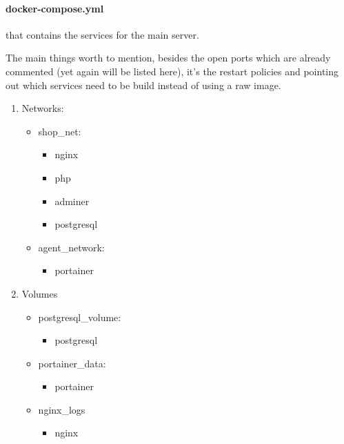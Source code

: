     \paragraph{docker-compose.yml} that contains the services for the main server.
    \newpage
    \newpage
    \begin{flushleft}
        The main things worth to mention, besides the open ports which are already commented (yet again will be listed here),
        it's the restart policies and pointing out which services need to be build instead of using a raw image.
    \end{flushleft}
    \begin{enumerate}
        \item Networks:
            \begin{itemize}
                \item shop\_net:
                \begin{itemize}
                    \item nginx
                    \item php
                    \item adminer
                    \item postgresql
                \end{itemize}
                \item agent\_network:
                \begin{itemize}
                    \item portainer
                \end{itemize}
            \end{itemize}
        \item Volumes
            \begin{itemize}
                \item postgresql\_volume:
                \begin{itemize}
                      \item postgresql
                \end{itemize}
                \item portainer\_data:
                \begin{itemize}
                      \item portainer
                \end{itemize}
                \item nginx_logs
                \begin{itemize}
                    \item nginx
                \end{itemize}
            \end{itemize}

    \end{enumerate}

